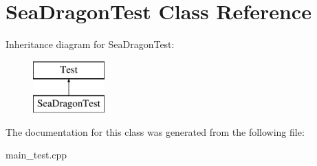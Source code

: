 \hypertarget{class_sea_dragon_test}{}\section{Sea\+Dragon\+Test Class Reference}
\label{class_sea_dragon_test}
Inheritance diagram for Sea\+Dragon\+Test\+:\begin{figure}[H]
\begin{center}
\leavevmode
\includegraphics[height=2.000000cm]{class_sea_dragon_test}
\end{center}
\end{figure}


The documentation for this class was generated from the following file\+:\begin{DoxyCompactItemize}
\item 
main\+\_\+test.\+cpp\end{DoxyCompactItemize}
